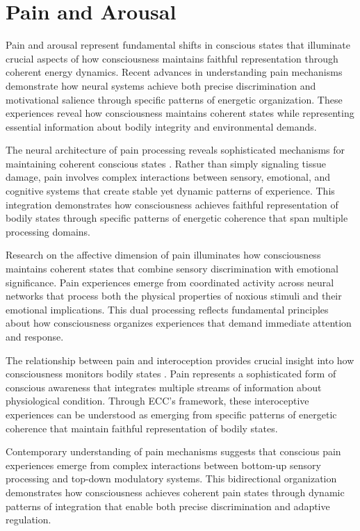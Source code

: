 \section{Pain and Arousal}

Pain and arousal represent fundamental shifts in conscious states that illuminate crucial aspects of how consciousness maintains faithful representation through coherent energy dynamics. Recent advances in understanding pain mechanisms \cite{Apkarian2005} demonstrate how neural systems achieve both precise discrimination and motivational salience through specific patterns of energetic organization. These experiences reveal how consciousness maintains coherent states while representing essential information about bodily integrity and environmental demands.

The neural architecture of pain processing reveals sophisticated mechanisms for maintaining coherent conscious states \cite{Tracey2007}. Rather than simply signaling tissue damage, pain involves complex interactions between sensory, emotional, and cognitive systems that create stable yet dynamic patterns of experience. This integration demonstrates how consciousness achieves faithful representation of bodily states through specific patterns of energetic coherence that span multiple processing domains.

Research on the affective dimension of pain \cite{Price2000} illuminates how consciousness maintains coherent states that combine sensory discrimination with emotional significance. Pain experiences emerge from coordinated activity across neural networks that process both the physical properties of noxious stimuli and their emotional implications. This dual processing reflects fundamental principles about how consciousness organizes experiences that demand immediate attention and response.

The relationship between pain and interoception provides crucial insight into how consciousness monitors bodily states \cite{Craig2003}. Pain represents a sophisticated form of conscious awareness that integrates multiple streams of information about physiological condition. Through ECC's framework, these interoceptive experiences can be understood as emerging from specific patterns of energetic coherence that maintain faithful representation of bodily states.

Contemporary understanding of pain mechanisms \cite{Garland2012} suggests that conscious pain experiences emerge from complex interactions between bottom-up sensory processing and top-down modulatory systems. This bidirectional organization demonstrates how consciousness achieves coherent pain states through dynamic patterns of integration that enable both precise discrimination and adaptive regulation.

